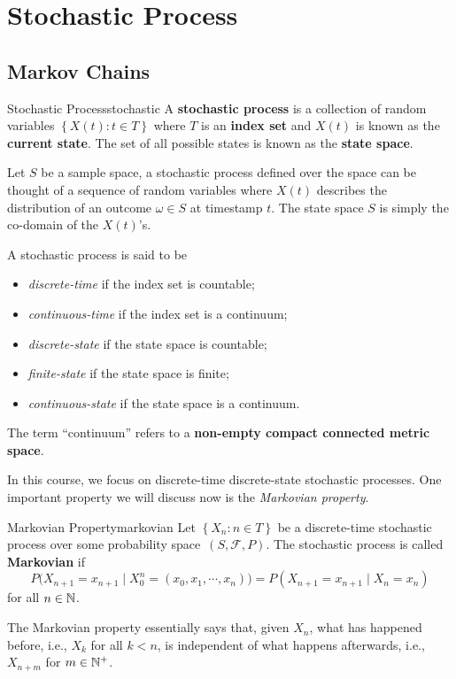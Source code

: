 \documentclass[math, code]{amznotes}
\theoremstyle{remark}
\begin{document}
\chapter{Stochastic Process}
\section{Markov Chains}
\begin{dfnbox}{Stochastic Process}{stochastic}
    A {\color{red} \textbf{stochastic process}} is a collection of random variables $\left\{X\left(t\right) \colon t \in T\right\}$ where $T$ is an {\color{red} \textbf{index set}} and $X\left(t\right)$ is known as the {\color{red} \textbf{current state}}. The set of all possible states is known as the {\color{red} \textbf{state space}}.
\end{dfnbox}
Let $S$ be a sample space, a stochastic process defined over the space can be thought of a sequence of random variables where $X\left(t\right)$ describes the distribution of an outcome $\omega \in S$ at timestamp $t$. The state space $S$ is simply the co-domain of the $X\left(t\right)$'s.

A stochastic process is said to be 
\begin{itemize}
    \item \textit{discrete-time} if the index set is countable;
    \item \textit{continuous-time} if the index set is a continuum;
    \item \textit{discrete-state} if the state space is countable;
    \item \textit{finite-state} if the state space is finite;
    \item \textit{continuous-state} if the state space is a continuum.
\end{itemize}
The term ``continuum'' refers to a \textbf{non-empty compact connected metric space}. 

In this course, we focus on discrete-time discrete-state stochastic processes. One important property we will discuss now is the \textit{Markovian property}.
\begin{dfnbox}{Markovian Property}{markovian}
    Let $\left\{X_n \colon n \in T\right\}$ be a discrete-time stochastic process over some probability space~$\left(S, \mathcal{F}, P\right)$. The stochastic process is called {\color{red} \textbf{Markovian}} if 
    \begin{equation*}
        P\bigl(X_{n + 1} = x_{n + 1} \mid X_0^n = \left(x_0, x_1, \cdots, x_n\right)\bigr) = P\left(X_{n + 1} = x_{n + 1} \mid X_n = x_n\right)
    \end{equation*}
    for all $n \in \mathbb{N}$.
\end{dfnbox}
The Markovian property essentially says that, given $X_n$, what has happened before, i.e., $X_k$ for all $k < n$, is independent of what happens afterwards, i.e., $X_{n + m}$ for $m \in \mathbb{N}^+$.
\end{document}
